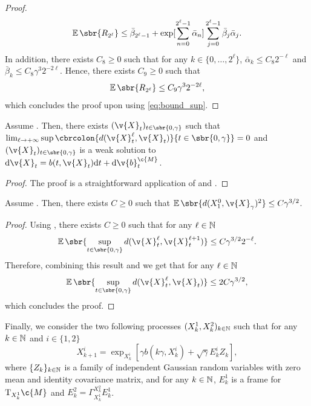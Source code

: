 \begin{proof}{}{}
\begin{equation} { \E\sbr{R_{2^\ell}} \leq \bar{\beta}_{2^{\ell}-1} + \exp[\sum_{n=0}^{2^\ell - 1} \bar{\alpha}_n] \sum_{j=0}^{2^\ell - 1} \bar{\beta}_j \bar{\alpha}_j .
		}
	\end{equation}
	In addition, there exists \(C_8 \geq 0\) such that for any \(k \in \{0, \dots, 2^\ell\}\), \(\bar{\alpha}_k \leq C_8 2^{-\ell}\) and \(\bar{\beta}_k \leq C_8 \gamma^3 2^{-2\ell}\).
	Hence, there exists \(C_9 \geq 0\) such that \begin{equation} \E\sbr{R_{2^\ell}} \leq C_9 \gamma^3 2^{-2\ell} , \end{equation} which concludes the proof upon using \eqref{eq:bound_sup}.

\end{proof}
\begin{proposition}
	\label{prop:limit_seq}
	Assume .
	Then, there exists \((\v{X}_t)_{t \in \sbr{0,\gamma}}\) such that \(\lim_{\ell \to +\infty} \sup \cbrcolon{d(\v{X}_t^\ell, \v{X}_t)}{t \in \sbr{0, \gamma}} =0\) and \((\v{X}_t)_{t \in \sbr{0,\gamma}}\) is a weak solution to \(\mathrm{d} \v{X}_t = b(t, \v{X}_t) \mathrm{d} t + \mathrm{d} \v{b}_t^\c{M}\).
\end{proposition}

\begin{proof}
	The proof is a straightforward application of  and \cite[A.1 (Step 2 and Step 3), A.2]{cheng2022theorymanifold}.
\end{proof}

\begin{proposition}
	\label{prop:borne_one_step}
	Assume .
	Then, there exists \(C \geq 0\) such that \(\E\sbr{d(X_1^0, \v{X}_\gamma)^2 } \leq C \gamma^{3/2}\).
\end{proposition}

\begin{proof}
	Using , there exists \(C \geq 0\) such that for any \(\ell \in \mathbb{N}\) \begin{equation} { \E\sbr{\sup_{t \in \sbr{0, \gamma}} d(\v{X}_t^\ell, \v{X}_t^{\ell+1})} \leq C \gamma^{3/2} 2^{-\ell} .
		}
	\end{equation}
	Therefore, combining this result and  we get that for any \(\ell \in \mathbb{N}\) \begin{equation} { \E\sbr{\sup_{t \in \sbr{0, \gamma}} d(\v{X}_t^\ell, \v{X}_t)} \leq 2 C \gamma^{3/2} , } \end{equation} which concludes the proof.
\end{proof}

Finally, we consider the two following processes \((X_k^1, X_k^2)_{k \in \mathbb{N}}\) such that for any \(k \in \mathbb{N}\) and \(i \in \{1, 2\}\) \begin{equation} X_{k+1}^i = \exp_{X_k^i}[\gamma b(k \gamma, X_k^i) + \sqrt{\gamma} E_k^i Z_k ] , \end{equation} where \(\{Z_k\}_{k \in \mathbb{N}}\) is a family of independent Gaussian random variables with zero mean and identity covariance matrix, and for any \(k \in \mathbb{N}\), \(E_k^1\) is a frame for \(\mathrm{T}_{X_k^1} \c{M}\) and \(E_k^2 = \Gamma_{X_k^1}^{X_k^2} E_k^1\).

